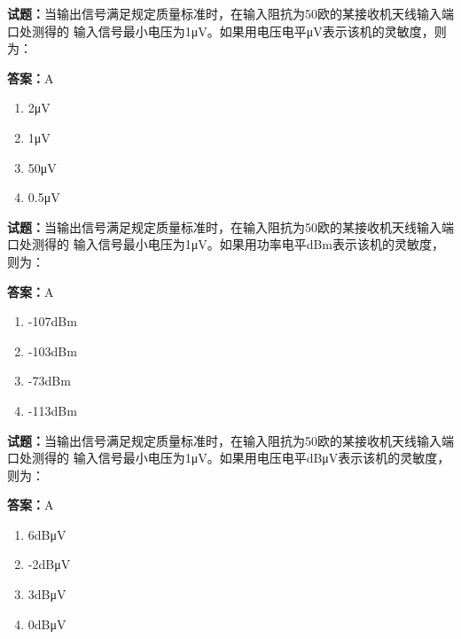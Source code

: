 \documentclass{ctexbook}
\begin{document}


\vspace{1em}

\textbf{试题：}当输出信号满足规定质量标准时，在输入阻抗为50欧的某接收机天线输入端口处测得的
输入信号最小电压为1μV。如果用电压电平μV表示该机的灵敏度，则为： 

\textbf{答案：}A 


\begin{enumerate}[leftmargin=3em]
  \item 2μV 

  \item 1μV 

  \item 50μV 

  \item 0.5μV 

\end{enumerate}





\vspace{1em}

\textbf{试题：}当输出信号满足规定质量标准时，在输入阻抗为50欧的某接收机天线输入端口处测得的
输入信号最小电压为1μV。如果用功率电平dBm表示该机的灵敏度，则为： 

\textbf{答案：}A 

\begin{enumerate}[leftmargin=3em]
  \item -107dBm 

  \item -103dBm 

  \item -73dBm 

  \item -113dBm 

\end{enumerate}





\vspace{1em}

\textbf{试题：}当输出信号满足规定质量标准时，在输入阻抗为50欧的某接收机天线输入端口处测得的
输入信号最小电压为1μV。如果用电压电平dBμV表示该机的灵敏度，则为： 

\textbf{答案：}A 

\begin{enumerate}[leftmargin=3em]
  \item 6dBμV 

  \item -2dBμV 

  \item 3dBμV 

  \item 0dBμV 

\end{enumerate}
\end{document}
